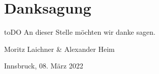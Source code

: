 \section*{Danksagung}

toDO
An dieser Stelle möchten wir danke sagen.

\vspace{1cm}

Moritz Laichner \& Alexander Heim

Innsbruck, 08. März 2022

\newpage